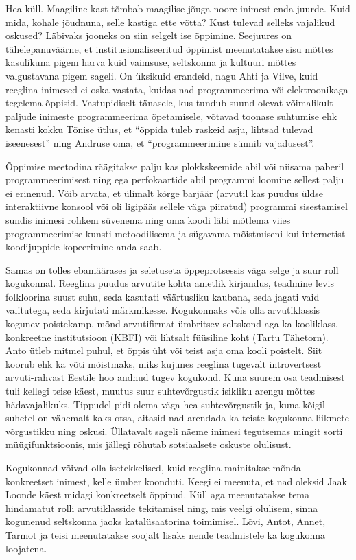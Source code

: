 Hea küll. Maagiline kast tõmbab maagilise jõuga noore inimest enda juurde. Kuid 
mida, kohale jõudnuna, selle kastiga ette võtta? Kust tulevad selleks vajalikud 
oskused? Läbivaks jooneks on siin selgelt ise õppimine. Seejuures on 
tähelepanuväärne, et institusionaliseeritud õppimist meenutatakse sisu mõttes 
kasulikuna pigem harva kuid vaimsuse, seltskonna ja kultuuri mõttes 
valgustavana pigem sageli. On üksikuid erandeid, nagu Ahti ja Vilve, kuid 
reeglina inimesed ei oska vastata, kuidas nad programmeerima või elektroonikaga 
tegelema õppisid. Vastupidiselt tänasele, kus tundub suund olevat võimalikult 
paljude inimeste programmeerima õpetamisele, võtavad toonase suhtumise ehk 
kenasti kokku Tõnise ütlus, et \enquote{õppida tuleb raskeid asju, lihtsad 
tulevad iseenesest} ning Andruse oma, et  \enquote{programmeerimine sünnib 
vajadusest}. 

Õppimise meetodina räägitakse palju kas plokkskeemide abil või niisama paberil 
programmeerimisest ning ega perfokaartide abil programmi loomine sellest palju 
ei erinenud. Võib arvata, et ülimalt kõrge barjäär (arvutil kas puudus üldse 
interaktiivne konsool või oli ligipääs sellele väga piiratud) programmi 
sisestamisel sundis inimesi rohkem süvenema ning oma koodi läbi mõtlema viies 
programmeerimise kunsti metoodilisema ja sügavama mõistmiseni kui internetist 
koodijuppide kopeerimine anda saab.

Samas on  tolles ebamäärases ja seletuseta õppeprotsessis väga selge ja suur 
roll kogukonnal. Reeglina puudus arvutite kohta ametlik kirjandus, teadmine 
levis folkloorina suust suhu, seda kasutati väärtusliku kaubana, seda jagati 
vaid valitutega, seda kirjutati märkmikesse. Kogukonnaks võis olla 
arvutiklassis kogunev poistekamp, mõnd arvutifirmat ümbritsev seltskond aga ka 
kooliklass, konkreetne institutsioon (KBFI) või lihtsalt füüsiline koht (Tartu 
Tähetorn). Anto ütleb mitmel puhul, et õppis üht või teist asja oma kooli 
poistelt. Siit koorub ehk ka võti mõistmaks, miks kujunes reeglina tugevalt 
introvertsest arvuti-rahvast Eestile hoo andnud tugev kogukond. Kuna suurem osa 
teadmisest tuli kellegi teise käest, muutus suur suhtevõrgustik isikliku arengu 
mõttes hädavajalikuks. Tippudel pidi olema väga hea suhtevõrgustik ja, kuna 
kõigil suhetel on vähemalt kaks otsa, aitasid nad arendada ka teiste kogukonna 
liikmete võrgustikku ning oskusi. Üllatavalt sageli näeme inimesi tegutsemas 
mingit sorti müügifunktsioonis, mis jällegi rõhutab sotsiaalsete oskuste 
olulisust. 

Kogukonnad võivad olla isetekkelised, kuid reeglina mainitakse mõnda 
konkreetset inimest, kelle ümber koonduti. Keegi ei meenuta, et nad oleksid 
Jaak Loonde käest midagi konkreetselt õppinud. Küll 
aga meenutatakse tema hindamatut rolli arvutiklasside tekitamisel ning, mis 
veelgi olulisem, sinna kogunenud seltskonna jaoks katalüsaatorina toimimisel. 
Lõvi, Antot, Annet, Tarmot ja teisi meenutatakse soojalt lisaks 
nende teadmistele ka kogukonna loojatena. 

